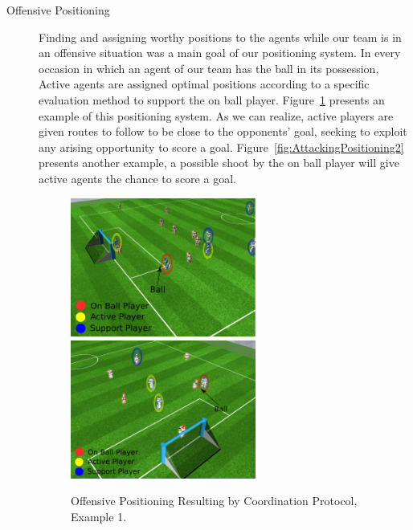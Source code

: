 \begin{description}
\item[Offensive Positioning]
Finding and assigning worthy positions to the agents while our team is in an offensive situation was a main goal of our positioning system. In every occasion in which an agent of our team has the ball in its possession, Active agents are assigned optimal positions according to a specific evaluation method to support the on ball player. Figure~\ref{fig:AttackingPositioning1} presents an example of this positioning system. As we can realize, active players are given routes to follow to be close to the opponents' goal, seeking to exploit any arising opportunity to score a goal. Figure~\ref{fig:AttackingPositioning2} presents another example, a possible shoot by the on ball player will give active agents the chance to score a goal.


\begin{figure}[h!]
\centering
  \includegraphics[width=0.6\textwidth]{Chapter5/figures/3.pdf}\\
  \includegraphics[width=0.6\textwidth]{Chapter5/figures/5.pdf}
  \caption{Offensive Positioning Resulting by Coordination Protocol, Example 1.} 
  \label{fig:AttackingPositioning1}
\end{figure}

\clearpage




\end{description}

